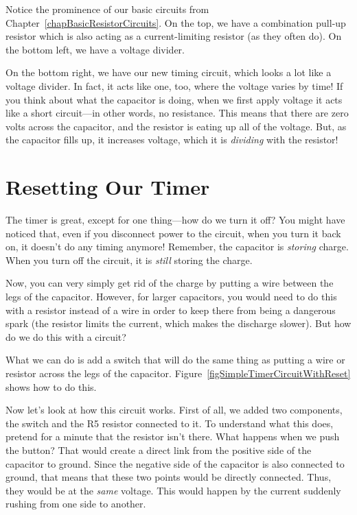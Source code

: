 Notice the prominence of our basic circuits from Chapter~\ref{chapBasicResistorCircuits}.
On the top, we have a combination pull-up resistor which is also acting as a current-limiting resistor (as they often do).
On the bottom left, we have a voltage divider.

On the bottom right, we have our new timing circuit, which looks a lot like a voltage divider.
In fact, it acts like one, too, where the voltage varies by time!
If you think about what the capacitor is doing, when we first apply voltage it acts like a short circuit---in other words, no resistance.
This means that there are zero volts across the capacitor, and the resistor is eating up all of the voltage.
But, as the capacitor fills up, it increases voltage, which it is \emph{dividing} with the resistor!

\section{Resetting Our Timer}

The timer is great, except for one thing---how do we turn it off?
You might have noticed that, even if you disconnect power to the circuit, when you turn it back on, it doesn't do any timing anymore!
Remember, the capacitor is \emph{storing} charge.
When you turn off the circuit, it is \emph{still} storing the charge.

Now, you can very simply get rid of the charge by putting a wire between the legs of the capacitor.
However, for larger capacitors, you would need to do this with a resistor instead of a wire in order to keep there from being a dangerous spark (the resistor limits the current, which makes the discharge slower).
But how do we do this with a circuit?

What we can do is add a switch that will do the same thing as putting a wire or resistor across the legs of the capacitor.
Figure~\ref{figSimpleTimerCircuitWithReset} shows how to do this.


Now let's look at how this circuit works.
First of all, we added two components, the switch and the R5 resistor connected to it.
To understand what this does, pretend for a minute that the resistor isn't there.
What happens when we push the button?
That would create a direct link from the positive side of the capacitor to ground.
Since the negative side of the capacitor is also connected to ground, that means that these two points would be directly connected.
Thus, they would be at the \emph{same} voltage.
This would happen by the current suddenly rushing from one side to another.

